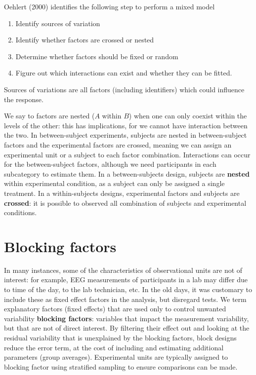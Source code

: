 \documentclass[
  11pt,
  letterpaper,
]{scrbook}
\providecommand{\tightlist}{%
  \setlength{\itemsep}{0pt}\setlength{\parskip}{0pt}}\usepackage{longtable,booktabs,array}
\theoremstyle{definition}
\theoremstyle{definition}
\theoremstyle{remark}
\begin{document}
Oehlert (2000) identifies the following step to perform a mixed model

\begin{enumerate}
\def\labelenumi{\arabic{enumi}.}
\tightlist
\item
  Identify sources of variation
\item
  Identify whether factors are crossed or nested
\item
  Determine whether factors should be fixed or random
\item
  Figure out which interactions can exist and whether they can be
  fitted.
\end{enumerate}

Sources of variations are all factors (including identifiers) which
could influence the response.

We say to factors are nested (\(A\) within \(B\)) when one can only
coexist within the levels of the other: this has implications, for we
cannot have interaction between the two. In between-subject experiments,
subjects are nested in between-subject factors and the experimental
factors are crossed, meaning we can assign an experimental unit or a
subject to each factor combination. Interactions can occur for the
between-subject factors, although we need participants in each
subcategory to estimate them. In a between-subjects design, subjects are
\textbf{nested} within experimental condition, as a subject can only be
assigned a single treatment. In a within-subjects designs, experimental
factors and subjects are \textbf{crossed}: it is possible to observed
all combination of subjects and experimental conditions.

\section{Blocking factors}\label{blocking-factors}

In many instances, some of the characteristics of observational units
are not of interest: for example, EEG measurements of participants in a
lab may differ due to time of the day, to the lab technician, etc. In
the old days, it was customary to include these as fixed effect factors
in the analysis, but disregard tests. We term explanatory factors (fixed
effects) that are used only to control unwanted variability
\textbf{blocking factors}: variables that impact the measurement
variability, but that are not of direct interest. By filtering their
effect out and looking at the residual variability that is unexplained
by the blocking factors, block designs reduce the error term, at the
cost of including and estimating additional parameters (group averages).
Experimental units are typically assigned to blocking factor using
stratified sampling to ensure comparisons can be made.
\end{document}
